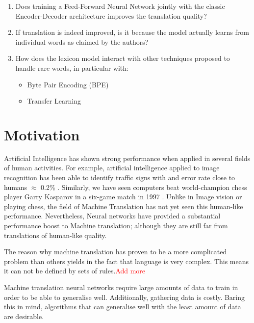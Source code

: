 \begin{enumerate}
    \itemsep0em 
    \item Does training a Feed-Forward Neural Network jointly with the classic Encoder-Decoder architecture improves the translation quality? 
    \item If translation is indeed improved, is it because the model actually learns from individual words as claimed by the authors?
    \item How does the lexicon model interact with other techniques proposed to handle rare words, in particular with:
    \begin{itemize}
        \itemsep0em 
        \item Byte Pair Encoding (BPE) \citep{DBLP:journals/corr/SennrichHB15}
        \item Transfer Learning \citep{DBLP:journals/corr/ZophYMK16}
    \end{itemize}
\end{enumerate}


\section{Motivation}

Artificial Intelligence has shown strong performance when applied in several fields of human activities. For example, artificial intelligence applied to image recognition has been able to identify traffic signs with and error rate close to humans $\approx$ 0.2\% \citep*{DBLP:journals/corr/abs-1202-2745}. Similarly, we have seen computers beat world-champion chess player Garry
Kasparov in a six-game match in 1997 \citep{Campbell:2002:DB:512148.512152}.
Unlike in Image vision or playing chess, the field of Machine Translation has not yet seen this human-like performance. Nevertheless, Neural networks have provided a substantial performance boost to Machine translation; although they are still far from translations of human-like quality. 

The reason why machine translation has proven to be a more complicated problem than others yields in the fact that language is very complex. This means it can not be defined by sets of rules.\textcolor{red}{Add more}

Machine translation neural networks require large amounts of data to train in order to be able to generalise well. Additionally, gathering data is costly. Baring this in mind, algorithms that can generalise well with the least amount of data are desirable. 

